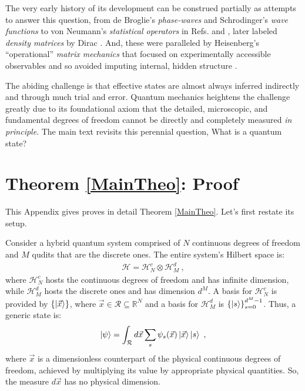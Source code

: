 \documentclass[draft,nofootinbib,pre,twocolumn,showpacs,showkeys,preprintnumbers,floatfix]{revtex4-1}
\newcommand{\1}{\mathbbm{1}}
\begin{document}
The very early history of its development can be construed partially as
attempts to answer this question, from de Broglie's \emph{phase-waves}
\cite{Brog25a} and Schrodinger's \emph{wave functions} \cite{Schr26a} to von
Neumann's \emph{statistical operators} in Refs. \cite{Neum27a} and \cite[Chap.
IV]{Neum32a}, later labeled \emph{density matrices} by Dirac
\cite{Dira29a,Dira30b,Dira31a}. And, these were paralleled by Heisenberg's
``operational'' \emph{matrix mechanics} that focused on experimentally
accessible observables and so avoided imputing internal, hidden structure
\cite{Heis25a}.

The abiding challenge is that effective states are almost always inferred
indirectly and through much trial and error. Quantum mechanics heightens the
challenge greatly due to its foundational axiom that the detailed, microscopic,
and fundamental degrees of freedom cannot be directly and completely measured
\emph{in principle}. The main text revisits this perennial question, What is a
quantum state?

\section{Theorem \ref{MainTheo}: Proof}
\label{sm:MainTheo}

This Appendix gives proves in detail Theorem \ref{MainTheo}.
Let's first restate its setup.

Consider a hybrid quantum system comprised of $N$ continuous degrees of freedom
and $M$ qudits that are the discrete ones. The entire system's Hilbert space
is:
\begin{align*}
\mathcal{H} = \mathcal{H}^c_N \otimes \mathcal{H}^d_M
  ~,
\end{align*}
where $\mathcal{H}_N^c$ hosts the continuous degrees of freedom and has
infinite dimension, while $\mathcal{H}^d_M$ hosts the discrete ones and has
dimension $d^M$. A basis for $\mathcal{H}_N^c$ is provided by
$\left\{\ket{\vec{x}}\right\}$, where $\vec{x} \in \mathcal{R} \subseteq
\mathbb{R}^N$ and a basis for $\mathcal{H}_M^d$ is
$\left\{\ket{s}\right\}_{s=0}^{d^M-1}$. Thus, a generic state is:
\begin{align}
\ket{\psi} = \int_{\mathcal{R}} d\vec{x} \sum_{s} \psi_s(\vec{x})\ket{\vec{x}} \ket{s}
  ~,\label{eq:first_step}
\end{align}
where $\vec{x}$ is a dimensionless counterpart of the physical continuous
degrees of freedom, achieved by multiplying its value by appropriate physical
quantities. So, the measure $d\vec{x}$ has no physical dimension. 
\end{document}
